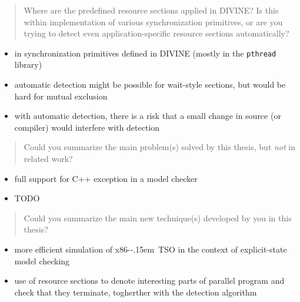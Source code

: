 \documentclass[aspectratio=169, fi]{paradise-slide}
\newcommand{\xtso}{\mbox{x86-\kern-.15em TSO}\xspace}
\newcommand{\rquote}[1]{\begin{quote}#1\end{quote}\bigskip\setlength{\leftmargini}{1em}}
\begin{document}
\begin{frame}[noframenumbering]{\qtitle}
  \rquote{Where are the predefined resource sections applied in DIVINE? Is this within
    implementation of various synchronization primitives, or are you trying to detect even
    application-specific resource sections automatically?}

  \begin{itemize}
    \item in synchronization primitives defined in DIVINE (mostly in the \texttt{pthread} library)
    \item automatic detection might be possible for wait-style sections, but would be hard for
      mutual exclusion
    \item with automatic detection, there is a risk that a small change in source (or compiler)
      would interfere with detection
  \end{itemize}
\end{frame}

\def\rname{prof. Jaco van de Pol}

\begin{frame}[noframenumbering]{\qtitle}
  \rquote{Could you summarize the main problem(s) solved by this thesis, but \emph{not} in related
    work?}
  \begin{itemize}
    \item full support for C++ exception in a model checker
    \item TODO
  \end{itemize}
\end{frame}

\begin{frame}[noframenumbering]{\qtitle}
  \rquote{Could you summarize the main new technique(s) developed by you in this thesis?}
  \begin{itemize}
    \item more efficient simulation of \xtso in the context of explicit-state model checking
    \medskip
    \item use of resource sections to denote interesting parts of parallel program and check that
      they terminate, togherther with the detection algorithm
  \end{itemize}
\end{frame}
\end{document}
